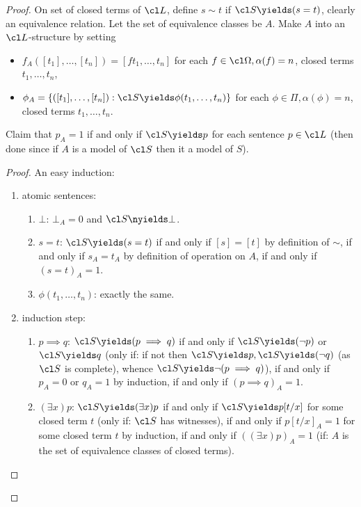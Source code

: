 \documentclass[a4paper]{article}
\begin{document}
\begin{proof}
  On set of closed terms of \(\cl L\), define \(s \sim t\) if \(\cl S \yields (s = t)\), clearly an equivalence relation. Let the set of equivalence classes be \(A\). Make \(A\) into an \(\cl L\)-structure by setting
  \begin{itemize}
  \item \(f_A([t_1], \dots, [t_n]) = [ft_1, \dots, t_n]\) for each \(f \in \cl \Omega, \alpha(f) = n\), closed terms \(t_1, \dots, t_n\),
  \item \(\phi_A = \{([t_1], \dots, [t_n]): \cl S \yields \phi(t_1, \dots, t_n)\}\) for each \(\phi \in \Pi, \alpha(\phi) = n\), closed terms \(t_1, \dots, t_n\).
  \end{itemize}
  Claim that \(p_A = 1\) if and only if \(\cl S \yields p\) for each sentence \(p \in \cl L\) (then done since if \(A\) is a model of \(\cl S\) then it a model of \(S\)).

  \begin{proof}
    An easy induction:
    \begin{enumerate}
    \item atomic sentences:
      \begin{enumerate}
      \item \(\bot\): \(\bot_A = 0\) and \(\cl S \nyields \bot\).
      \item \(s = t\): \(\cl S \yields (s = t)\) if and only if \([s] = [t]\) by definition of \(\sim\), if and only if \(s_A = t_A\) by definition of operation on \(A\), if and only if \((s = t)_A = 1\).
      \item \(\phi(t_1, \dots, t_n)\): exactly the same.
      \end{enumerate}
    \item induction step:
      \begin{enumerate}
      \item \(p \implies q\): \(\cl S \yields (p \implies q)\) if and only if \(\cl S \yields (\neg p)\) or \(\cl S \yields q\) (only if: if not then \(\cl S \yields p, \cl S \yields (\neg q)\) (as \(\cl S\) is complete), whence \(\cl S \yields \neg(p \implies q)\)), if and only if \(p_A = 0\) or \(q_A = 1\) by induction, if and only if \((p \implies q)_A = 1\).
      \item \((\exists x) p\): \(\cl S \yields (\exists x) p\) if and only if \(\cl S \yields p[t/x]\) for some closed term \(t\) (only if: \(\cl S\) has witnesses), if and only if \(p[t/x]_A = 1\) for some closed term \(t\) by induction, if and only if \(((\exists x) p)_A = 1\) (if: \(A\) is the set of equivalence classes of closed terms).
      \end{enumerate}
    \end{enumerate}
  \end{proof}
\end{proof}
\end{document}

